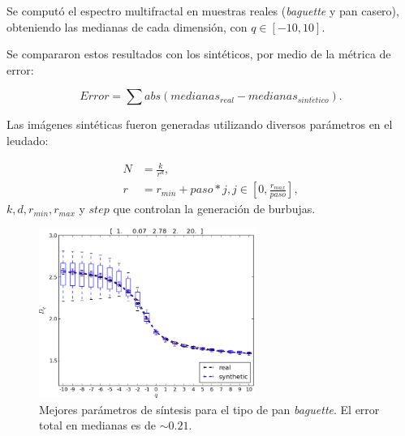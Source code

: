 \documentclass[spanish]{beamer}
\begin{document}
\begin{frame}
Se computó el espectro multifractal en muestras reales ({\em baguette} y pan casero), obteniendo las medianas de cada dimensión, con $q \in [-10,10]$.

Se compararon estos resultados con los sintéticos, por medio de la métrica de error:

\begin{equation*}
Error = \displaystyle \sum abs(medianas_{real}-medianas_{sint\acute{e}tico}).
\end{equation*}

Las imágenes sintéticas fueron generadas utilizando diversos parámetros en el leudado:

\begin{align*}
N &= \frac{k}{r^{d}},\\ r &= r_{min}+paso*j, j \in [0,\frac{r_{max}}{paso}],
\end{align*}
\noindent $k,d,r_{min},r_{max}$ y $step$ que controlan la generación de burbujas.

\end{frame}

\begin{frame}
\begin{figure}[!ht]
\includegraphics[width=7cm]{../figures/bestboxplot}
\caption[Mejores parámetros de síntesis para el tipo de pan {\em baguette}]{Mejores parámetros de síntesis para el tipo de pan {\em baguette}. El error total en medianas es de $\sim 0.21$.}
\label{bestboxplot}
\end{figure}

\end{frame}
\end{document}
